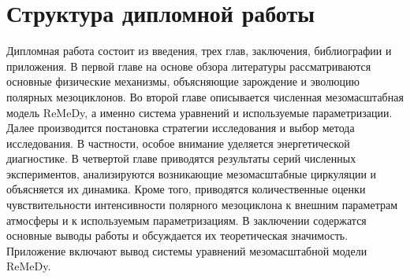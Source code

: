 \documentclass[12pt,a4paper]{report}
\begin{document}
\section{Структура дипломной работы}
Дипломная работа состоит из введения, трех глав, заключения, библиографии и приложения. В первой главе на основе обзора литературы рассматриваются основные физические механизмы, объясняющие зарождение и эволюцию полярных мезоциклонов. Во второй главе описывается численная мезомасштабная модель ReMeDy, а именно система уравнений и используемые параметризации. Далее производится постановка стратегии исследования и выбор метода исследования. В частности, особое внимание уделяется энергетической диагностике. В четвертой главе приводятся результаты серий численных экспериментов, анализируются возникающие мезомасштабные циркуляции и объясняется их динамика. Кроме того, приводятся количественные оценки чувствительности интенсивности полярного мезоциклона к внешним параметрам атмосферы и к используемым параметризациям. В заключении содержатся основные выводы работы и обсуждается их теоретическая значимость. Приложение включают вывод системы уравнений мезомасштабной модели ReMeDy.
\end{document}
